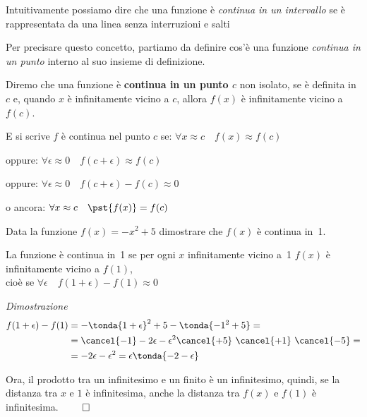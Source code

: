 Intuitivamente possiamo dire che una funzione è 
\emph{continua in un intervallo} 
se è rappresentata da una linea senza interruzioni e salti

Per precisare questo concetto, partiamo da definire cos'è una funzione 
\emph{continua in un punto} interno al suo insieme di definizione.

\begin{definizione}
Diremo che una funzione è \textbf{continua in un punto \(c\)} non isolato, 
se è definita in \(c\) e, 
quando \(x\) è infinitamente vicino a \(c\), 
allora \(f(x)\) è infinitamente vicino a \(f(c)\). 

\vspace{1em}
E si scrive \(f\) è continua nel punto \(c\) se: \hspace{12mm}
\(\forall x \approx c \quad f(x) \approx f(c)\)

\vspace{.5em}
oppure: \hspace{58mm}
\(\forall \epsilon \approx 0 \quad f(c + \epsilon) \approx f(c)\)

\vspace{.5em}
oppure: \hspace{58mm}
\(\forall \epsilon \approx 0 \quad f(c + \epsilon) - f(c) \approx 0\)

\vspace{.5em}
o ancora: \hspace{56mm}
\(\forall x \approx c \quad \pst{f(x)} = f(c)\)
\end{definizione}

\begin{esempio}
Data la funzione \(f(x)=-x^2+5\) dimostrare che \(f(x)\) è continua in~1.

{
La funzione è continua in~1 se per ogni \(x\) infinitamente vicino a~1 
\(f(x)\) è infinitamente vicino a \(f(1)\), \\
cioè se \(\forall \epsilon \quad f(1 + \epsilon) - f(1) \approx 0\)

\emph{Dimostrazione}
\begin{align*}
f(1+\epsilon) - f(1) &= 
-\tonda{1+\epsilon}^2+5-\tonda{-1^2+5}=\\
&=\cancel{-1}-2\epsilon-\epsilon^2 \cancel{+5}~
  \cancel{+1}~\cancel{-5} = \\
&=-2\epsilon-\epsilon^2 = 
\epsilon \tonda{-2 - \epsilon}
\end{align*}
}{
\scalebox{1}{\contprimo}
}
Ora, il prodotto tra un infinitesimo e un finito è un infinitesimo, quindi, 
se la distanza tra \(x\) e \(1\) è infinitesima, anche la distanza tra 
\(f(x)\) e \(f(1)\) è infinitesima. \hfill \(\qed\) 
 
\end{esempio}

